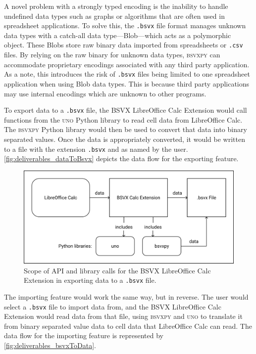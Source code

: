 \documentclass[10pt]{article}
\begin{document}
\indent{}
A novel problem with a strongly typed encoding is the inability to handle undefined data types such as graphs or algorithms that are often used in spreadsheet applications.
To solve this, the \texttt{.bsvx} file format manages unknown data types with a catch-all data type---Blob---which acts as a polymorphic object.
These Blobs store raw binary data imported from spreadsheets or \texttt{.csv} files.
By relying on the raw binary for unknown data types, \textsc{bsvxpy} can accommodate proprietary encodings associated with any third party application.
As a note, this introduces the risk of \texttt{.bsvx} files being limited to one spreadsheet application when using Blob data types.
This is because third party applications may use internal encodings which are unknown to other programs.

\indent{}
To export data to a \texttt{.bsvx} file, the BSVX LibreOffice Calc Extension would call functions from the \textsc{uno} Python library to read cell data from LibreOffice Calc.
The \textsc{bsvxpy} Python library would then be used to convert that data into binary separated values.
Once the data is appropriately converted, it would be written to a file with the extension \texttt{.bsvx} and as named by the user.
\autoref{fig:deliverables_dataToBsvx} depicts the data flow for the exporting feature.

\begin{figure}[H]
\centering
\includegraphics[width=5in]{figures/dataToBsvx.png}
\caption{Scope of API and library calls for the BSVX LibreOffice Calc Extension in exporting data to a \texttt{.bsvx} file.}
\label{fig:deliverables_dataToBsvx}
\end{figure}

\indent{}
The importing feature would work the same way, but in reverse.
The user would select a \texttt{.bsvx} file to import data from, and the BSVX LibreOffice Calc Extension would read data from that file, using \textsc{bsvxpy} and \textsc{uno} to translate it from binary separated value data to cell data that LibreOffice Calc can read.
The data flow for the importing feature is represented by \autoref{fig:deliverables_bsvxToData}.
    
\end{document}
